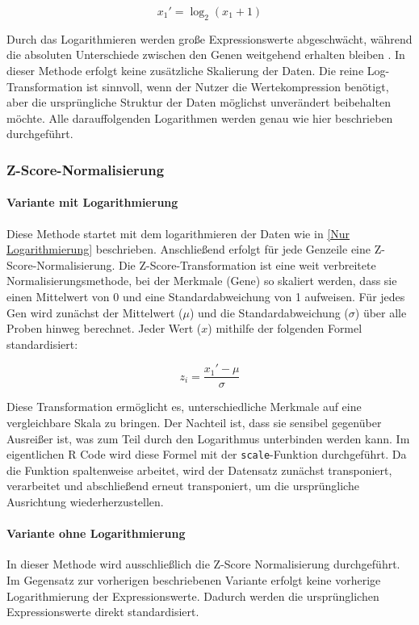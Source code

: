 \documentclass[12pt]{article}
\begin{document}
\[x_1'=\log_2(x_1+1)\]

Durch das Logarithmieren werden große Expressionswerte abgeschwächt, während die absoluten Unterschiede zwischen den Genen weitgehend erhalten bleiben \cite{Durbin2002}. In dieser Methode erfolgt keine zusätzliche Skalierung der Daten. Die reine Log-Transformation ist sinnvoll, wenn der Nutzer die Wertekompression benötigt, aber die ursprüngliche Struktur der Daten möglichst unverändert beibehalten möchte. Alle darauffolgenden Logarithmen werden genau wie hier beschrieben durchgeführt.

\subsubsection{Z-Score-Normalisierung}
\label{Z-Score-Normalisierung}

\paragraph{Variante mit Logarithmierung}

Diese Methode startet mit dem logarithmieren der Daten wie in \ref{Nur Logarithmierung} beschrieben.
Anschließend erfolgt für jede Genzeile eine Z-Score-Normalisierung. Die Z-Score-Transformation ist eine weit verbreitete Normalisierungsmethode, bei der Merkmale (Gene) so skaliert werden, dass sie einen Mittelwert von 0 und eine Standardabweichung von 1 aufweisen. Für jedes Gen wird zunächst der Mittelwert ($\mu$) und die Standardabweichung ($\sigma$) über alle Proben hinweg berechnet\cite{Deng2025}. Jeder Wert ($x$) mithilfe der folgenden Formel standardisiert:

\[z_i=\frac{x_1'-\mu}{\sigma}\]

Diese Transformation ermöglicht es, unterschiedliche Merkmale auf eine vergleichbare Skala zu bringen\cite{Deng2025}. Der Nachteil ist, dass sie sensibel gegenüber Ausreißer ist, was zum Teil durch den Logarithmus unterbinden werden kann. Im eigentlichen R Code wird diese Formel mit der \texttt{scale}-Funktion durchgeführt. Da die Funktion spaltenweise arbeitet, wird der Datensatz zunächst transponiert, verarbeitet und abschließend erneut transponiert, um die ursprüngliche Ausrichtung wiederherzustellen.

\paragraph{Variante ohne Logarithmierung}

In dieser Methode wird ausschließlich die Z-Score Normalisierung durchgeführt. Im Gegensatz zur vorherigen beschriebenen Variante erfolgt keine vorherige Logarithmierung der Expressionswerte. Dadurch werden die ursprünglichen Expressionswerte direkt standardisiert.
\end{document}
